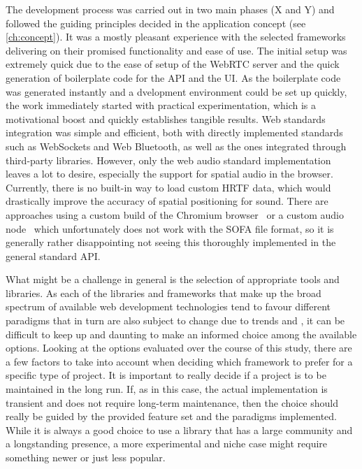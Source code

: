 The development process was carried out in two main phases (X and Y) and followed the guiding principles decided in the application concept (see \autoref{ch:concept}).
It was a mostly pleasant experience with the selected frameworks delivering on their promised functionality and ease of use.
The initial setup was extremely quick due to the ease of setup of the WebRTC server and the quick generation of boilerplate code for the \ac{API} and the \ac{UI}.
As the boilerplate code was generated instantly and a dvelopment environment could be set up quickly, the work immediately started with practical experimentation, which is a motivational boost and quickly establishes tangible results.
Web standards integration was simple and efficient, both with directly implemented standards such as WebSockets and Web Bluetooth, as well as the ones integrated through third-party libraries.
However, only the web audio standard implementation leaves a lot to desire, especially the support for spatial audio in the browser.
Currently, there is no built-in way to load custom \ac{HRTF} data, which would drastically improve the accuracy of spatial positioning for sound.
There are approaches using a custom build of the Chromium browser~\parencite{chromiumCustomHrtf} or a custom audio node~\parencite{customHrtfAudioNode} which unfortunately does not work with the \ac{SOFA} file format, so it is generally rather disappointing not seeing this thoroughly implemented in the general standard \ac{API}.

What might be a challenge in general is the selection of appropriate tools and libraries.
As each of the libraries and frameworks that make up the broad spectrum of available web development technologies tend to favour different paradigms that in turn are also subject to change due to trends and , it can be difficult to keep up and daunting to make an informed choice among the available options.
Looking at the options evaluated over the course of this study, there are a few factors to take into account when deciding which framework to prefer for a specific type of project.
It is important to really decide if a project is to be maintained in the long run. If, as in this case, the actual implementation is transient and does not require long-term maintenance, then the choice should really be guided by the provided feature set and the paradigms implemented. While it is always a good choice to use a library that has a large community and a longstanding presence, a more experimental and niche case might require something newer or just less popular.

